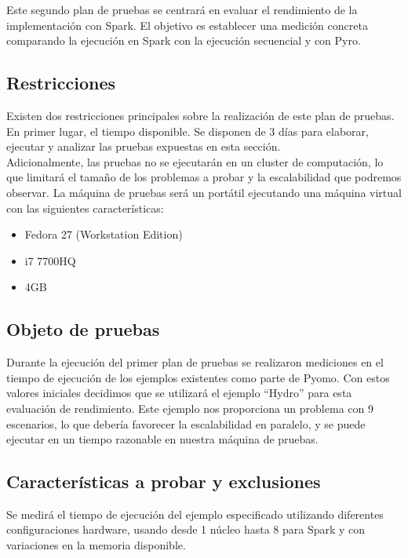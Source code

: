 Este segundo plan de pruebas se centrará en evaluar el rendimiento de la implementación con Spark. El objetivo es establecer una medición concreta comparando la ejecución en Spark con la ejecución secuencial y con Pyro.

\subsection{Restricciones}

Existen dos restricciones principales sobre la realización de este plan de pruebas. En primer lugar, el tiempo disponible. Se disponen de 3 días para elaborar, ejecutar y analizar las pruebas expuestas en esta sección. \\

Adicionalmente, las pruebas no se ejecutarán en un cluster de computación, lo que limitará el tamaño de los problemas a probar y la escalabilidad que podremos observar. La máquina de pruebas será un portátil ejecutando una máquina virtual con las siguientes características:

\begin{itemize}
    \item Fedora 27 (Workstation Edition)
    \item i7 7700HQ
    \item 4GB
\end{itemize}

\subsection{Objeto de pruebas}

Durante la ejecución del primer plan de pruebas se realizaron mediciones en el tiempo de ejecución de los ejemplos existentes como parte de Pyomo. Con estos valores iniciales decidimos que se utilizará el ejemplo ``Hydro'' para esta evaluación de rendimiento. Este ejemplo nos proporciona un problema con 9 escenarios, lo que debería favorecer la escalabilidad en paralelo, y se puede ejecutar en un tiempo razonable en nuestra máquina de pruebas.

\subsection{Características a probar y exclusiones}

Se medirá el tiempo de ejecución del ejemplo especificado utilizando diferentes configuraciones hardware, usando desde 1 núcleo hasta 8 para Spark y con variaciones en la memoria disponible.

